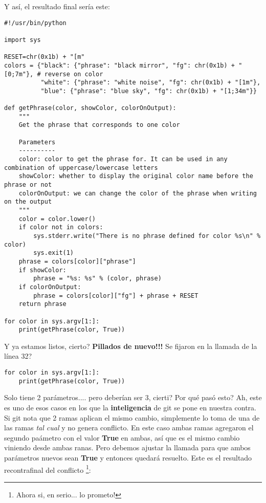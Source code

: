 Y así, el resultado final sería este:

\begin{lstlisting}[style=python_style,
	basicstyle=\small,
	caption={\bf Ejemplo 16} - conflictos resueltos]
#!/usr/bin/python

import sys

RESET=chr(0x1b) + "[m"
colors = {"black": {"phrase": "black mirror", "fg": chr(0x1b) + "[0;7m"}, # reverse on color
          "white": {"phrase": "white noise", "fg": chr(0x1b) + "[1m"},
          "blue": {"phrase": "blue sky", "fg": chr(0x1b) + "[1;34m"}}

def getPhrase(color, showColor, colorOnOutput):
    """
    Get the phrase that corresponds to one color
    
    Parameters
    ----------
    color: color to get the phrase for. It can be used in any combination of uppercase/lowercase letters
    showColor: whether to display the original color name before the phrase or not
    colorOnOutput: we can change the color of the phrase when writing on the output
    """
    color = color.lower()
    if color not in colors:
        sys.stderr.write("There is no phrase defined for color %s\n" % color)
        sys.exit(1)
    phrase = colors[color]["phrase"]
    if showColor:
        phrase = "%s: %s" % (color, phrase)
    if colorOnOutput:
        phrase = colors[color]["fg"] + phrase + RESET
    return phrase

for color in sys.argv[1:]:
    print(getPhrase(color, True))
\end{lstlisting}

Y ya estamos listos, cierto? {\bf Pillados de nuevo!!!} Se fijaron en la llamada de la línea 32?

\begin{lstlisting}[style=python_style,
	firstnumber=31,
	basicstyle=\small,
	caption={\bf Ejemplo 16} - llamada que debe ser ajustada]
for color in sys.argv[1:]:
    print(getPhrase(color, True))
\end{lstlisting}

Solo tiene 2 parámetros.... pero deberían ser 3, cierti? Por qué pasó esto? Ah, este es uno de esos casos en los que la
{\bf inteligencia} de git se pone en nuestra contra. Si git nota que 2 ramas aplican el mismo cambio, simplemente lo toma
de una de las ramas {\it tal cual} y no genera conflicto. En este caso ambas ramas agregaron el segundo paámetro con el valor
{\bf True} en ambas, así que es el mismo cambio viniendo desde ambas ranas. Pero debemos ajustar la llamada para que ambos parámetros
nuevos sean {\bf True} y entonces quedará resuelto. Este es el resultado recontrafinal del conflicto
\footnote{Ahora si, en serio... lo prometo!}:


